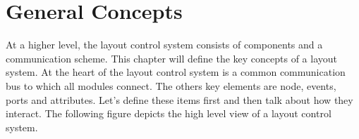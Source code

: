 %
%
%
\chapter{General Concepts}

At a higher level, the layout control system consists of components and a communication scheme. This chapter will define the key concepts of a layout system. At the heart of the layout control system is a common communication bus to which all modules connect. The others key elements are node, events, ports and attributes. Let's define these items first and then talk about how they interact. The following figure depicts the high level view of a layout control system.

